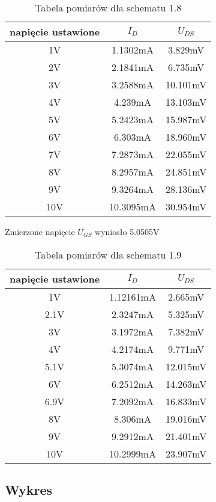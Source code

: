 \documentclass[polish,a4paper]{article}
\begin{document}
\begin{table}[H]
\centering
\begin{tabular}{|c|c|c|}
\hline
napięcie ustawione & $I_{D}  $ & $U_{DS}$ \\
\hline 
1V & 1.1302mA & 3.829mV \\
\hline
2V & 2.1841mA & 6.735mV \\
\hline
3V & 3.2588mA & 10.101mV\\
\hline
4V & 4.239mA & 13.103mV\\
\hline
5V & 5.2423mA & 15.987mV\\
\hline
6V & 6.303mA & 18.960mV\\
\hline
7V & 7.2873mA & 22.055mV\\
\hline
8V & 8.2957mA & 24.851mV\\
\hline
9V & 9.3264mA & 28.136mV\\
\hline
10V & 10.3095mA & 30.954mV\\
\hline


\end{tabular}
\caption{Tabela pomiarów dla schematu 1.8}
\end{table}

Zmierzone napięcie $U_{GS}$ wyniosło 5.0505V
\begin{table}[H]
\centering
\begin{tabular}{|c|c|c|}
\hline
napięcie ustawione & $I_{D}  $ & $U_{DS}$ \\
\hline 
1V & 1.12161mA & 2.665mV \\
\hline
2.1V & 2.3247mA & 5.325mV \\
\hline
3V & 3.1972mA & 7.382mV\\
\hline
4V & 4.2174mA & 9.771mV\\
\hline
5.1V & 5.3074mA & 12.015mV\\
\hline
6V & 6.2512mA & 14.263mV\\
\hline
6.9V & 7.2092mA & 16.833mV\\
\hline
8V & 8.306mA & 19.016mV\\
\hline
9V & 9.2912mA & 21.401mV\\
\hline
10V & 10.2999mA & 23.907mV\\
\hline


\end{tabular}
\caption{Tabela pomiarów dla schematu 1.9}
\end{table}

\subsection{Wykres}
\end{document}
